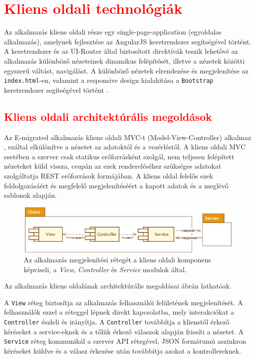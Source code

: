 \chapter{\textcolor{red}{Kliens oldali technológiák}}\label{ch:kliens}

	Az alkalmazás kliens oldali része egy single-page-application (egyoldalas alkalmazás)\cite{SPA}, amelynek fejlesztése az AngularJS keretrendszer segítségével történt. A keretrendszer és az UI-Router által biztosított direktívák teszik lehetővé az alkalmazás különböző nézeteinek dinamikus felépítését, illetve a nézetek közötti egyszerű váltást, navigálást. A különböző nézetek elrendezése és megjelenítése az \texttt{index.html}-en, valamint a responsive design kialakitása a \texttt{Bootstrap} keretrendszer segítségével történt \cite{Bootstrap} . 

\section{\textcolor{red}{Kliens oldali architektúrális megoldások}}
Az E-migrated alkalmazás kliens oldali MVC-t (Model-View-Controller) alkalmaz \cite{WebMVC}, ezáltal elkülönítve a nézetet az adatoktól és a vezérléstől. A kliens oldali MVC esetében a szerver csak statikus erőforrásként szolgál, nem teljesen felépített nézeteket küld vissza, csupán az ezek rendereléséhez szükséges adatokat szolgáltatja REST erőforrások formájában. A kliens oldal felelős ezek feldolgozásáért és megfelelő megjelenítéséért a kapott adatok és a meglévő sablonok alapján.

\begin{figure}
  \centering
  \includegraphics[width=0.9\linewidth]{images/ClientArchitecture}
  \caption{Az alkalmazás megjelenítési rétegét a kliens oldali komponens képviseli, a \textsl{View}, \textsl{Controller} és \textsl{Service} modulok által. }
  \label{fig:ClientArchitecture}
\end{figure}
Az alkalmazás kliens oldalának architektúrális megoldásai  ábrán lathatóak. 

A \texttt{View} réteg biztosítja az alkalmazás felhasználói felületének megjelenítését. A felhasználók ezzel a réteggel lépnek direkt kapcsolatba, mely interakciókat a \texttt{Controller} észleli és irányítja. A \texttt{Controller} továbbítja a klienstől érkező kéréseket a service-eknek és a tőlük érkező válaszok alapján frissíti a nézetet. A \texttt{Service} réteg kommunikál a szerver API rétegével, JSON formátumú aszinkron kéréseket küldve és a válasz érkezése után továbbítja azokat a kontrollereknek. 

